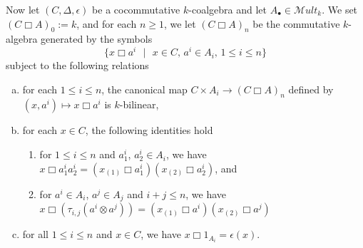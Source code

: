\documentclass[10pt, colorlinks]{article}
\numberwithin{equation}{section} \DeclareMathSizes{2}{10}{12}{13}
\begin{document}
 \smallskip  
Now let $(C,\Delta,\epsilon)$ be a cocommutative $k$-coalgebra and let 
$A_\bullet\in \mathscr Mult_k$.  We set $(C\Box A)_0:=k$, and for each $n\geq1$, we let  $(C\Box A)_n$ be the commutative $k$-algebra  generated by the symbols 
\begin{equation} 
\{\mbox{$x\Box a^i$ $\vert$  $x\in C$, $a^i\in A_i$, $1\leq i\leq n$}\}
\end{equation} subject to the following relations
\begin{enumerate}[(a)]
        \item for each $1\leq i\leq n$,  the canonical map $C\times A_i\longrightarrow (C\Box A)_n$ defined by $(x,a^i)\mapsto x\Box a^i$  is $k$-bilinear,
        \item for each $x\in C$, the following identities hold 
        \begin{enumerate}[(1)] 
            \item for $1\leq i\leq n$ and $a_1^i$, $a_2^i\in A_i$, we have $x\Box a^i_1a^i_2=(x_{(1)}\Box a^i_1)(x_{(2)}\Box a^i_2)$, and
            \item for $a^i\in A_i$, $a^j\in A_j$ and $i+j\leq n$, we have $x\Box (\tau_{i,j}(a^i\otimes a^j))=(x_{(1)}\Box a^i)(x_{(2)}\Box a^j)$
        \end{enumerate}
        \item  for all $1\leq i\leq n$ and $x\in C$, we have $x\Box 1_{A_i}=\epsilon(x)$.
    \end{enumerate}
\end{document}
